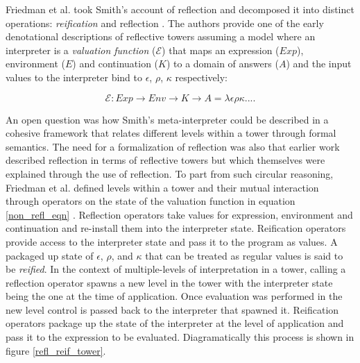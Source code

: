 \documentclass[fleqn]{article}
\theoremstyle{definition}
\begin{document}
Friedman et al. took Smith's account of reflection and decomposed it into distinct operations: \textit{reification} and reflection \cite{friedman1984reification, wand1988mystery}. The authors provide one of the early denotational descriptions of reflective towers assuming a model where an interpreter is a \textit{valuation function} ($\mathcal{E}$) that maps an expression ($Exp$), environment ($E$) and continuation ($K$) to a domain of answers ($A$) and the input values to the interpreter bind to $\epsilon$, $\rho$, $\kappa$ respectively:

\begin{equation}\label{non_refl_eqn}
\mathcal{E}: Exp \rightarrow Env \rightarrow K \rightarrow A = \lambda\epsilon\rho\kappa....
\end{equation}

An open question was how Smith's meta-interpreter \cite{smith1982reflection} could be described in a cohesive framework that relates different levels within a tower through formal semantics. The need for a formalization of reflection was also that earlier work described reflection in terms of reflective towers but which themselves were explained through the use of reflection. To part from such circular reasoning, Friedman et al. defined levels within a tower and their mutual interaction through operators on the state of the valuation function in equation \ref{non_refl_eqn} \cite{friedman1984reification}. Reflection operators take values for expression, environment and continuation and re-install them into the interpreter state. Reification operators provide access to the interpreter state and pass it to the program as values. A packaged up state of $\epsilon$, $\rho$, and $\kappa$ that can be treated as regular values is said to be \textit{reified}. In the context of multiple-levels of interpretation in a tower, calling a reflection operator spawns a new level in the tower with the interpreter state being the one at the time of application. Once evaluation was performed in the new level control is passed back to the interpreter that spawned it. Reification operators package up the state of the interpreter at the level of application and pass it to the expression to be evaluated. Diagramatically this process is shown in figure \ref{refl_reif_tower}.

\end{document}

